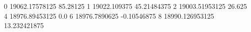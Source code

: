 0 19062.17578125 85.28125
1 19022.109375 45.21484375
2 19003.51953125 26.625
4 18976.89453125 0.0
6 18976.7890625 -0.10546875
8 18990.126953125 13.232421875
